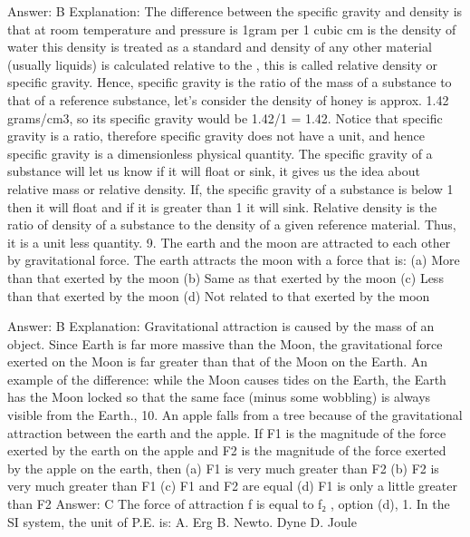 Answer: B
Explanation: The difference between the specific gravity and density is that at room temperature and pressure is 1gram per 1 cubic cm is the density of water this density is treated as a standard and density of any other material (usually liquids) is calculated relative to the , this is called relative density or specific gravity. Hence, specific gravity is the ratio of the mass of a substance to that of a reference substance, let’s consider the density of honey is approx. 1.42 grams/cm3, so its specific gravity would be 1.42/1 = 1.42. Notice that specific gravity is a ratio, therefore specific gravity does not have a unit, and hence specific gravity is a dimensionless physical quantity. The specific gravity of a substance will let us know if it will float or sink, it gives us the idea about relative mass or relative density. If,  the specific gravity of a substance is below 1 then it will float and if it is greater than 1 it will sink. Relative density is the ratio of density of a substance to the density of a given reference material. Thus, it is a unit less quantity. 9. The earth and the moon are attracted to each other by gravitational force. The earth attracts the moon with a force that is: (a) More than that exerted by the moon (b) Same as that exerted by the moon (c) Less than that exerted by the moon (d) Not related to that exerted by the moon 

Answer: B
Explanation: Gravitational attraction is caused by the mass of an object. Since Earth is far more massive than the Moon, the gravitational force exerted on the Moon is far greater than that of the Moon on the Earth. An example of the difference: while the Moon causes tides on the Earth, the Earth has the Moon locked so that the same face (minus some wobbling) is always visible from the Earth.,  10. An apple falls from a tree because of the gravitational attraction between the earth and the apple. If F1 is the magnitude of the force exerted by the earth on the apple and F2 is the magnitude of the force exerted by the apple on the earth, then (a) F1 is very much greater than F2 (b) F2 is very much greater than F1 (c) F1 and F2 are equal (d) F1 is only a little greater than F2 
Answer: C The force of attraction f is equal to f₂ , option (d),  1. In the SI system, the unit of P.E. is: A. Erg 
B. Newto. Dyne D. Joule 


